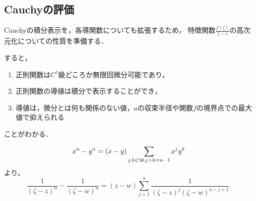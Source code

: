 \documentclass[uplatex, dvipdfmx]{jsreport}
\begin{document}
\subsection{Cauchyの評価}

\begin{screen}
    Cauchyの積分表示を，各導関数についても拡張するため，
    特徴関数$\frac{f(\zeta)}{\zeta-z}$の高次元化についての性質を準備する．

    すると，
    \begin{enumerate}
        \item 正則関数は$C^1$級どころか無限回微分可能であり，
        \item 正則関数の導値は積分で表示することができ，
        \item 導値は，微分とは何も関係のない値，$a$の収束半径や関数$f$の境界点での最大値で抑えられる
    \end{enumerate}
    ことがわかる．
\end{screen}

\begin{discussion}
    \[x^n-y^n=(x-y)\sum_{j,k\in\N,j+k=n-1}x^jy^k\]
    より，
    \[ \frac{1}{(\zeta-z)^n}-\frac{1}{(\zeta-w)^n}=(z-w)\sum^n_{j=1}\frac{1}{(\zeta-z)^j(\zeta-w)^{n-j+1}}. \]
\end{discussion}
\end{document}
